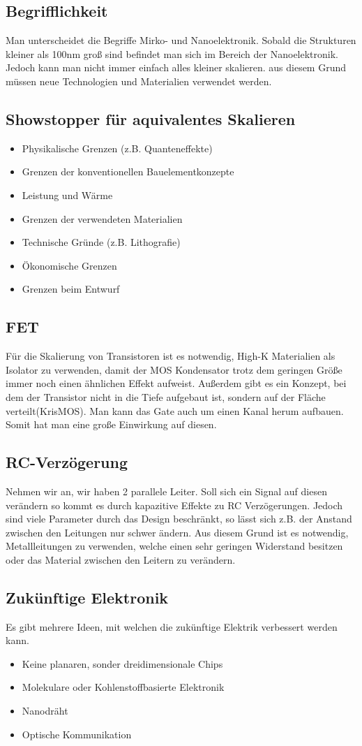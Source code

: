 \subsection{Begrifflichkeit}
	Man unterscheidet die Begriffe Mirko- und Nanoelektronik. Sobald die Strukturen kleiner als 100nm groß sind befindet man sich im Bereich der Nanoelektronik. Jedoch kann man nicht immer einfach alles kleiner skalieren. aus diesem Grund müssen neue Technologien und Materialien verwendet werden.
\subsection{Showstopper für aquivalentes Skalieren}
	\begin{itemize}
		\item Physikalische Grenzen (z.B. Quanteneffekte)
		\item Grenzen der konventionellen Bauelementkonzepte
		\item Leistung und Wärme
		\item Grenzen der verwendeten Materialien
		\item Technische Gründe (z.B. Lithografie)
		\item Ökonomische Grenzen
		\item Grenzen beim Entwurf
	\end{itemize}
\subsection{FET}
	Für die Skalierung von Transistoren ist es notwendig, High-K Materialien als Isolator zu verwenden, damit der MOS Kondensator trotz dem geringen Größe immer noch einen ähnlichen Effekt aufweist. Außerdem gibt es ein Konzept, bei dem der Transistor nicht in die Tiefe aufgebaut ist, sondern auf der Fläche verteilt(KrisMOS). Man kann das Gate auch um einen Kanal herum aufbauen. Somit hat man eine große Einwirkung auf diesen.
\subsection{RC-Verzögerung}
	Nehmen wir an, wir haben 2 parallele Leiter. Soll sich ein Signal auf diesen verändern so kommt es durch kapazitive Effekte zu RC Verzögerungen. Jedoch sind viele Parameter durch das Design beschränkt, so lässt sich z.B. der Anstand zwischen den Leitungen nur schwer ändern. Aus diesem Grund ist es notwendig, Metallleitungen zu verwenden, welche einen sehr geringen Widerstand besitzen oder das Material zwischen den Leitern zu verändern.
\subsection{Zukünftige Elektronik}
	Es gibt mehrere Ideen, mit welchen die zukünftige Elektrik verbessert werden kann.
	\begin{itemize}
		\item Keine planaren, sonder dreidimensionale Chips
		\item Molekulare oder Kohlenstoffbasierte Elektronik
		\item Nanodräht
		\item Optische Kommunikation
	\end{itemize}

